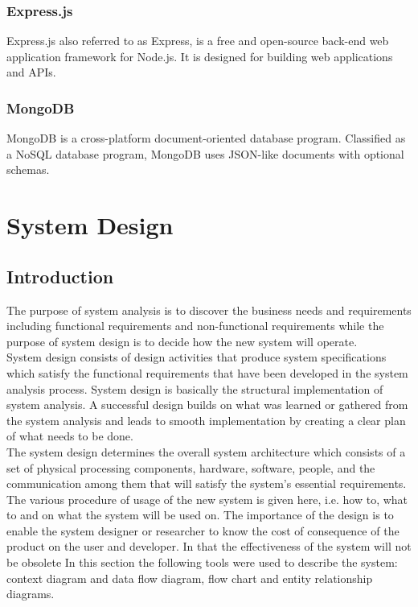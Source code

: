 \documentclass[twoside, a4paper, 12pt]{report}
\begin{document}
\subsection{Express.js}
Express.js also referred to as Express, is a free and open-source back-end web application framework for Node.js. It is designed for building web applications and APIs.

\subsection{MongoDB}
MongoDB is a cross-platform document-oriented database program. Classified as a NoSQL database program, MongoDB uses JSON-like documents with optional schemas.

\chapter{System Design}
\section{Introduction}
The purpose of system analysis is to discover the business needs and requirements including functional requirements and non-functional requirements while the purpose of system design is to decide how the new system will operate.\\
\indent
System design consists of design activities that produce system specifications which satisfy the functional requirements that have been developed in the system analysis process. System design is basically the structural implementation of system analysis. A successful design builds on what was learned or gathered from the system analysis and leads to smooth implementation by creating a clear plan of what needs to be done.\\
\indent
The system design determines the overall system architecture which consists of a set of physical processing components, hardware, software, people, and the communication among them that will satisfy the system's essential requirements. The various procedure of usage of the new system is given here, i.e. how to, what to and on what the system will be used on. The importance of the design is to enable the system designer or researcher to know the cost of consequence of the product on the user and developer. In that the effectiveness of the system will not be obsolete %
\indent
In this section the following tools were used to describe the system: context diagram and data flow diagram, flow chart and entity relationship diagrams.
\end{document}

